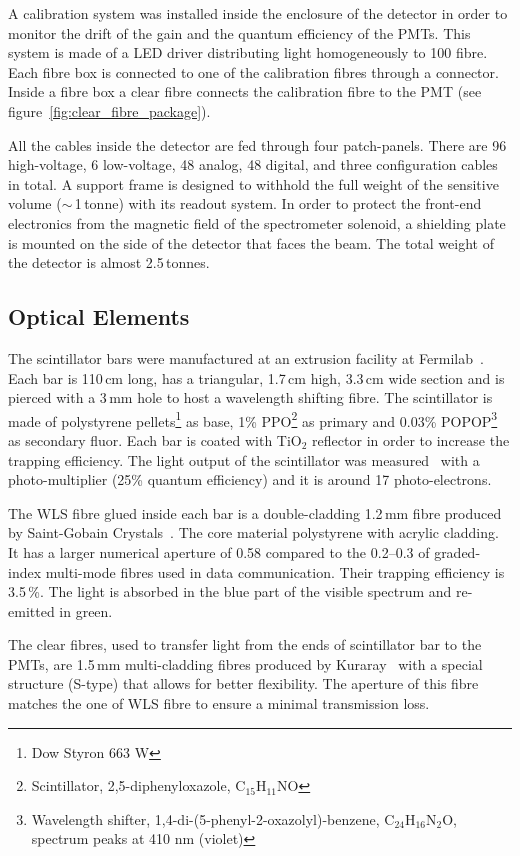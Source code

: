 \documentclass[a4paper,11pt]{article}
\begin{document}
A calibration system was installed inside the enclosure of the detector in order to monitor the drift of the gain and the quantum
efficiency of the PMTs. This system is made of a LED driver distributing light homogeneously to 100 fibre. Each fibre box is
connected to one of the calibration fibres through a connector. Inside a fibre box a clear fibre connects the calibration
fibre to the PMT (see figure~\ref{fig:clear_fibre_package}).

All the cables inside the detector are fed through four patch-panels. There are 96 high-voltage, 6 low-voltage, 48 analog, 48 digital,
and three configuration cables in total. A support frame is designed to withhold the full weight of the sensitive volume ($\sim$\,1\,tonne) with its readout system.
In order to protect the front-end electronics from the magnetic field of the spectrometer solenoid,  a shielding plate is mounted on the side of the detector that faces the beam. The total weight of the detector is almost
2.5\,tonnes.

\subsection{Optical Elements}
The scintillator bars were manufactured at an extrusion facility at Fermilab~\cite{PlaDalmau:2001fr}. Each bar is 110\,cm long, has a triangular, 1.7\,cm high, 3.3\,cm wide section and is pierced with a 3\,mm hole to host a wavelength shifting fibre.
The scintillator is made of polystyrene pellets\footnote{Dow Styron 663 W} as base, 1\% PPO\footnote{Scintillator, 2,5-diphenyloxazole,
C$_{15}$H$_{11}$NO} as primary and 0.03\% POPOP\footnote{Wavelength shifter, 1,4-di-(5-phenyl-2-oxazolyl)-benzene, C$_{24}$H$_{16}$N$_{2}$O,
spectrum peaks at 410 nm (violet)} as secondary fluor. Each bar is coated with TiO$_2$ reflector in order to increase the trapping efficiency. The light output of the scintillator was measured~\cite{PlaDalmau:2001fr} with a photo-multiplier (25\% quantum efficiency)
and it is around 17 photo-electrons. 

The WLS fibre glued inside each bar is a double-cladding 1.2\,mm fibre produced by Saint-Gobain Crystals~\cite{saintgobain}.
The core material polystyrene with acrylic cladding. It has a larger numerical aperture of 0.58 compared to the 0.2--0.3
of graded-index multi-mode fibres used in data communication. Their trapping efficiency is 3.5\,\%. The light is absorbed in the blue part of
the visible spectrum and re-emitted in green. 

The clear fibres, used to transfer light from the ends of scintillator bar to the PMTs, are 1.5\,mm multi-cladding fibres produced by 
Kuraray~\cite{kuraray} with a special structure (S-type) that allows for better flexibility. The aperture of this fibre matches
the one of WLS fibre to ensure a minimal transmission loss.
\end{document}
